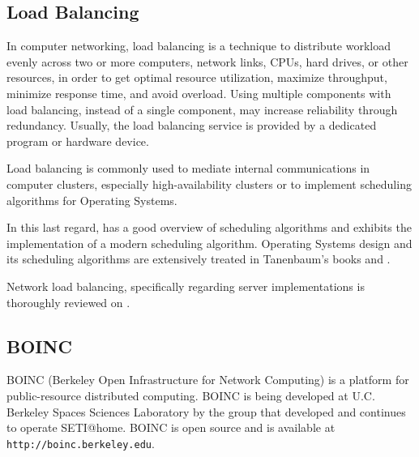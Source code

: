 \documentclass[a4paper,12pt,english]{report}
\begin{document}

\subsection{Load Balancing}

In computer networking, load balancing is a technique to distribute workload evenly across two or more computers, network links, CPUs, hard drives, or other resources, in order to get optimal resource utilization, maximize throughput, minimize response time, and avoid overload. Using multiple components with load balancing, instead of a single component, may increase reliability through redundancy. Usually, the load balancing service is provided by a dedicated program or hardware device.

Load balancing is commonly used to mediate internal communications in computer clusters, especially high-availability clusters or to implement scheduling algorithms for Operating Systems. 

In this last regard, \cite{sched2} has a good overview of scheduling algorithms and \cite{sched1} exhibits the implementation of a modern scheduling algorithm. Operating Systems design and its scheduling algorithms are extensively treated in Tanenbaum's books\cite{tanenbaum1} and \cite{tanenbaum2}.

Network load balancing, specifically regarding server implementations is thoroughly reviewed on \cite{loadbal}.

\subsection{BOINC}\label{boinc}

BOINC (Berkeley Open Infrastructure for Network Computing) is a platform for public-resource distributed computing. BOINC is being developed at U.C. Berkeley Spaces Sciences Laboratory by the group that developed and continues to operate SETI@home. BOINC is open source and is available at \texttt{http://boinc.berkeley.edu}\cite{boinc1}.
\end{document}
